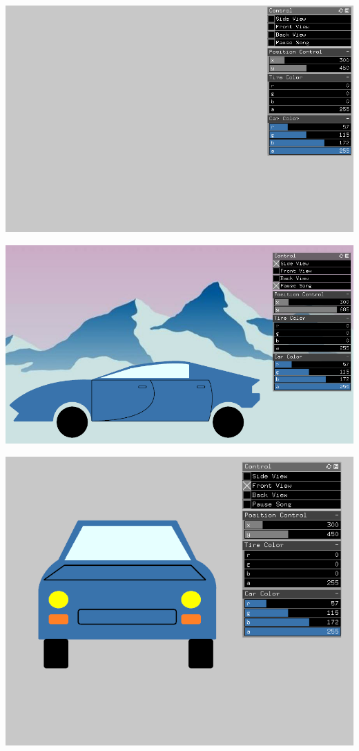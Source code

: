 \documentclass[letterpaper, 24pt, final, onecolumn, titlepage] {article}
\begin{document}
\begin{center}\includegraphics{GUI} \end{center}
\begin{center}\includegraphics{sideView} \end{center}
\begin{center}\includegraphics{frontView} \end{center}
\end{document}
